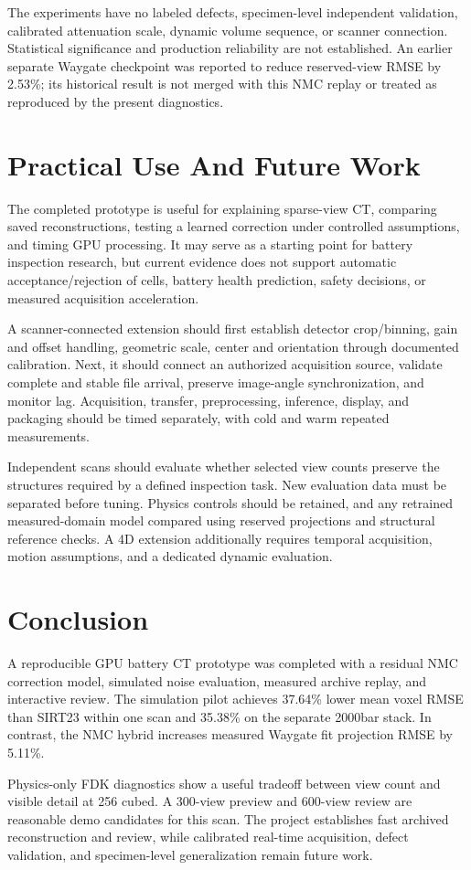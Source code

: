 \documentclass[conference,a4paper]{IEEEtran}
\begin{document}
The experiments have no labeled defects, specimen-level independent validation, calibrated attenuation scale, dynamic volume sequence, or scanner connection. Statistical significance and production reliability are not established. An earlier separate Waygate checkpoint was reported to reduce reserved-view RMSE by 2.53\%; its historical result is not merged with this NMC replay or treated as reproduced by the present diagnostics.

\section{Practical Use And Future Work}

The completed prototype is useful for explaining sparse-view CT, comparing saved reconstructions, testing a learned correction under controlled assumptions, and timing GPU processing. It may serve as a starting point for battery inspection research, but current evidence does not support automatic acceptance/rejection of cells, battery health prediction, safety decisions, or measured acquisition acceleration.

A scanner-connected extension should first establish detector crop/binning, gain and offset handling, geometric scale, center and orientation through documented calibration. Next, it should connect an authorized acquisition source, validate complete and stable file arrival, preserve image-angle synchronization, and monitor lag. Acquisition, transfer, preprocessing, inference, display, and packaging should be timed separately, with cold and warm repeated measurements.

Independent scans should evaluate whether selected view counts preserve the structures required by a defined inspection task. New evaluation data must be separated before tuning. Physics controls should be retained, and any retrained measured-domain model compared using reserved projections and structural reference checks. A 4D extension additionally requires temporal acquisition, motion assumptions, and a dedicated dynamic evaluation.

\section{Conclusion}

A reproducible GPU battery CT prototype was completed with a residual NMC correction model, simulated noise evaluation, measured archive replay, and interactive review. The simulation pilot achieves 37.64\% lower mean voxel RMSE than SIRT23 within one scan and 35.38\% on the separate 2000bar stack. In contrast, the NMC hybrid increases measured Waygate fit projection RMSE by 5.11\%.

Physics-only FDK diagnostics show a useful tradeoff between view count and visible detail at 256 cubed. A 300-view preview and 600-view review are reasonable demo candidates for this scan. The project establishes fast archived reconstruction and review, while calibrated real-time acquisition, defect validation, and specimen-level generalization remain future work.


\end{document}
